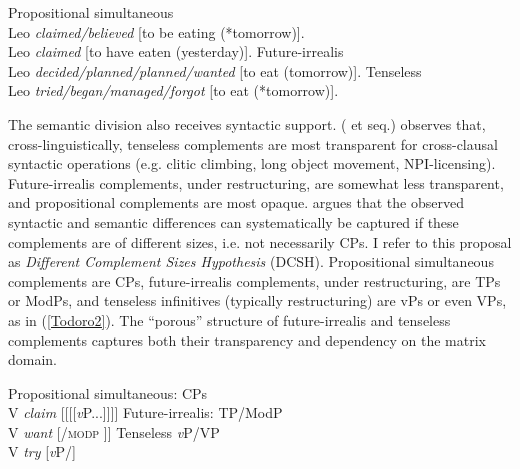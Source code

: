 \documentclass[output=paper]{langscibook}
\begin{document}
\begin{exe}
\ex \label{Todoro1}
\begin{xlist}
\ex \label{Todoro1a}
Propositional simultaneous\\
    Leo \textit{claimed/believed} [to be eating (*tomorrow)].\\
    Leo \textit{claimed} [to have eaten (yesterday)].
\ex \label{Todoro1b}
Future-irrealis\\
Leo \textit{decided/planned/planned/wanted} [to eat	(tomorrow)].
\ex \label{Todoro1c}
Tenseless\\
    Leo \textit{tried/began/managed/forgot} [to eat (*tomorrow)].	\\
    \hfill \citep{wurmbrand2014a}
\end{xlist}
\end{exe}\largerpage[2]

\begin{sloppypar}
The semantic division also receives syntactic support. \citeauthor{wurmbrand2001a} (\citeyear{wurmbrand2001a} et seq.) observes that, cross-linguistically, tenseless complements are most transparent for cross-clausal syntactic operations (e.g. clitic climbing, long object movement, NPI-licensing). Future-irrealis complements, under restructuring, are somewhat less transparent, and propositional complements are most opaque. \citeauthor{wurmbrand2001a} argues that the observed syntactic and semantic differences can systematically be captured if these complements are of different sizes, i.e. not necessarily CPs. I refer to this proposal as \emph{Different Complement Sizes Hypothesis} (DCSH). Propositional simultaneous complements are CPs, future-irrealis complements, under restructuring, are TPs or ModPs, and tenseless infinitives (typically restructuring) are vPs or even VPs, as in (\ref{Todoro2}). The ``porous'' structure of future-irrealis and tenseless complements captures both their transparency and dependency on the matrix domain.
\end{sloppypar}

\begin{exe}
\ex \label{Todoro2}
\begin{xlist}
\ex \label{Todoro2a}
Propositional simultaneous: CPs \\
    V \emph{claim} [{\CP}[{\tp}[{\aspp}[{\textit{v}P}...]]]]
\ex \label{Todoro2b}
Future-irrealis: TP/ModP \\
V \emph{want} [\tp/\textsc{modp} \woll [\aspp[\textit{v}P...]]]
\ex \label{Todoro2c}
Tenseless \textit{v}P/VP \\
V \emph{try} [\textit{v}P/\vp]
\end{xlist}
\end{exe}
\end{document}
